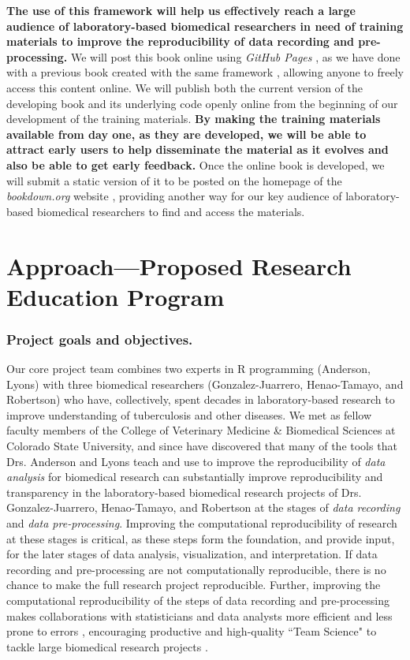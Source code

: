 \documentclass[pdftex,english,11pt,parskip=half]{scrartcl}
\begin{document}
\textbf{The use of this framework will help us effectively reach a large
audience of laboratory-based biomedical researchers in need of training materials to improve the reproducibility of data
recording and pre-processing.} We will 
post this book online using \textit{GitHub Pages} \cite{gitpages}, as we have done
with a previous book created with the same framework \cite{andersoncoursebook}, allowing anyone to
freely access this content online. We will publish both the current version of the developing book and its underlying code openly online from the beginning
of our development of the training materials. \textbf{By making the training
materials available from day one, as they are developed, we will be able to
attract early users to help disseminate the material as it evolves and also be
able to get early feedback.} Once the online
book is developed, we will submit a static version of it to be posted
on the homepage of the \textit{bookdown.org} website \cite{bookdownorg}, providing
another way for our key audience of laboratory-based biomedical researchers to find and access the materials.

\section{Approach---Proposed Research Education Program}

\subsubsection*{Project goals and objectives.} 

Our core project team combines two experts in R programming
(Anderson, Lyons) with three biomedical researchers (Gonzalez-Juarrero,
Henao-Tamayo, and Robertson) who have, collectively, spent decades in
laboratory-based research to improve understanding of tuberculosis and other
diseases. We met as fellow faculty members of the College of Veterinary Medicine \& Biomedical Sciences at Colorado State
University, and since have discovered that many of the tools that Drs. Anderson
and Lyons teach and use to improve the reproducibility of \textit{data analysis}
for biomedical research can substantially improve reproducibility and
transparency in the laboratory-based biomedical research projects of Drs.
Gonzalez-Juarrero, Henao-Tamayo, and Robertson at the stages of \textit{data
recording} and \textit{data pre-processing}. Improving the computational 
reproducibility of research at these stages is critical, as these steps form the foundation, and 
provide input, for the later stages of data analysis, visualization, and 
interpretation. If data recording and pre-processing are not computationally reproducible, there 
is no chance to make the full research project reproducible.
Further, improving the computational reproducibility of the steps of data recording and pre-processing makes collaborations with
statisticians 
and data analysts more efficient and less prone to errors \cite{ellis2018share},  encouraging productive and high-quality ``Team Science" to tackle large biomedical research projects \cite{munafo2017manifesto}.
\end{document}
